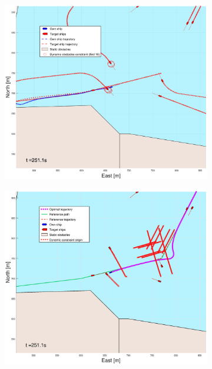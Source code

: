 \begin{figure}[ht!]
\begin{subfigure}[b]{0.499\textwidth}
    \end{subfigure}
    \hfill
    \\
    \begin{subfigure}[b]{0.49\textwidth}
        \centering
        \includegraphics[width=\textwidth]{Images/Figures/Trheimfjord/_Simple_0fig1_time=251}
    \end{subfigure}
    \hfill
    \begin{subfigure}[b]{0.499\textwidth}
        \centering
        \includegraphics[width=\textwidth]{Images/Figures/Trheimfjord/_Simple_0fig999_time=251}

\end{subfigure}
\end{figure}
